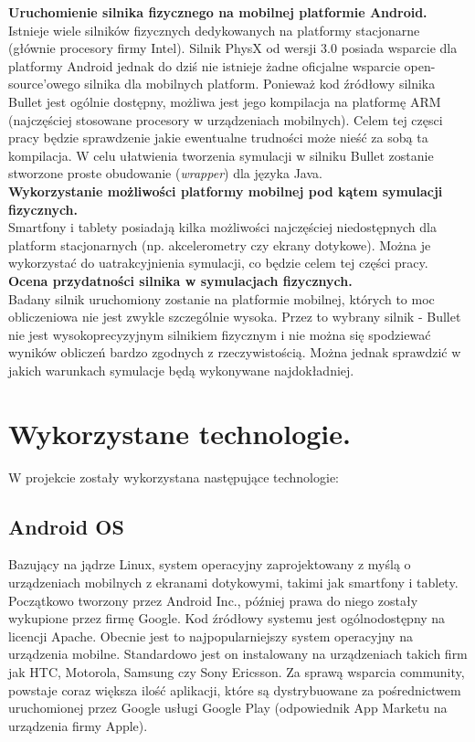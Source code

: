 \textbf{Uruchomienie silnika fizycznego na mobilnej platformie Android.}\\
Istnieje wiele silników fizycznych dedykowanych na platformy
stacjonarne (głównie procesory firmy Intel). Silnik PhysX od wersji 3.0
posiada wsparcie dla platformy Android jednak do dziś nie istnieje żadne
oficjalne wsparcie open-source'owego silnika dla mobilnych platform. Ponieważ
kod źródłowy silnika Bullet jest ogólnie dostępny, możliwa jest jego kompilacja
na platformę ARM (najczęściej stosowane procesory w urządzeniach mobilnych).
Celem tej częsci pracy będzie sprawdzenie jakie ewentualne trudności może nieść
za sobą ta kompilacja. W celu ułatwienia tworzenia symulacji w silniku Bullet
zostanie stworzone proste obudowanie (\emph{wrapper}) dla języka Java.\\

\textbf{Wykorzystanie możliwości platformy mobilnej pod kątem symulacji
fizycznych.}\\ Smartfony i tablety posiadają kilka możliwości
najczęściej niedostępnych dla platform stacjonarnych (np. akcelerometry czy
ekrany dotykowe). Można je wykorzystać do uatrakcyjnienia symulacji, co
będzie celem tej części pracy.\\

\textbf{Ocena przydatności silnika w symulacjach fizycznych.}\\ Badany
silnik uruchomiony zostanie na platformie mobilnej, których to moc obliczeniowa
nie jest zwykle szczególnie wysoka. Przez to wybrany silnik - Bullet nie jest
wysokoprecyzyjnym silnikiem fizycznym i nie można się spodziewać wyników
obliczeń bardzo zgodnych z rzeczywistością. Można jednak sprawdzić w jakich
warunkach symulacje będą wykonywane najdokładniej.

\newpage
\section{Wykorzystane technologie.}
W projekcie zostały wykorzystana następujące technologie:

\subsection{Android OS}
Bazujący na jądrze Linux, system operacyjny zaprojektowany z myślą o
urządzeniach mobilnych z ekranami dotykowymi, takimi jak smartfony i tablety.
Początkowo tworzony przez Android Inc., później prawa do niego zostały wykupione
przez firmę Google. Kod źródłowy systemu jest ogólnodostępny na licencji Apache. 
Obecnie jest to najpopularniejszy system operacyjny na urządzenia mobilne.
Standardowo jest on instalowany na urządzeniach takich firm jak HTC, Motorola,
Samsung czy Sony Ericsson. Za sprawą wsparcia community, powstaje coraz większa
ilość aplikacji, które są dystrybuowane za pośrednictwem uruchomionej przez
Google usługi Google Play (odpowiednik App Marketu na urządzenia firmy Apple).

